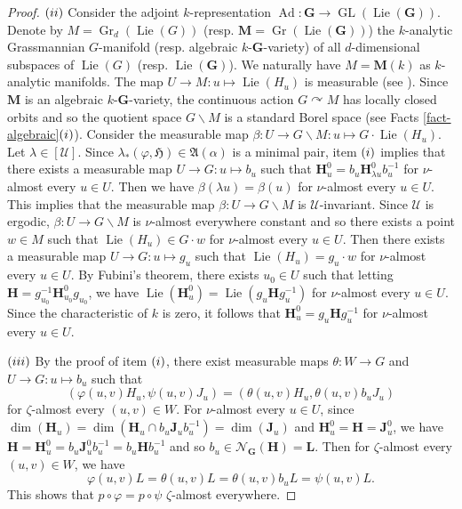 \documentclass[11pt]{amsart}
\numberwithin{equation}{section}
\theoremstyle{plain}
\theoremstyle{definition}
\newcommand{\Ad}{\operatorname{Ad}}
\newcommand{\GL}{\operatorname{GL}}
\newcommand{\Lie}{\operatorname{Lie}}
\newcommand{\Gr}{\operatorname{Gr}}
\begin{document}
\begin{proof}
$(\rm ii)$ Consider the adjoint $k$-representation $\Ad : \mathbf G \to \GL(\Lie(\mathbf G))$. Denote by $M = \Gr_d(\Lie(G))$ (resp.\! $\mathbf M = \Gr(\Lie(\mathbf G))$) the $k$-analytic Grassmannian $G$-manifold (resp.\! algebraic $k$-$\mathbf G$-variety) of all $d$-dimensional subspaces of $\Lie(G)$ (resp.\! $\Lie(\mathbf G)$). We naturally have $M = \mathbf M(k)$ as $k$-analytic manifolds. The map $U \to M : u \mapsto \Lie(H_u)$ is measurable (see \cite[Section 3]{NZ00}). Since $\mathbf M$ is an algebraic $k$-$\mathbf G$-variety, the continuous action $G \curvearrowright M$ has locally closed orbits and so the quotient space $G\backslash M$ is a standard Borel space (see Facts \ref{fact-algebraic}$(\rm i)$). Consider the measurable map $\beta : U \to G\backslash M : u \mapsto G \cdot \Lie(H_u)$. Let $\lambda \in [\mathscr U]$. Since $\lambda_\ast (\varphi, \mathfrak H) \in \mathfrak A(\alpha)$ is a minimal pair, item $(\rm i)$ implies that there exists a measurable map $U \to G : u \mapsto b_u$ such that $\mathbf H_u^0 = b_u \mathbf H_{\lambda u}^0 b_u^{-1}$ for $\nu$-almost every $u \in U$. Then we have $\beta(\lambda u) = \beta(u)$ for $\nu$-almost every $u \in U$. This implies that the measurable map $\beta : U \to G\backslash M$ is $\mathscr U$-invariant. Since $\mathscr U$ is ergodic, $\beta : U \to G\backslash M$ is $\nu$-almost everywhere constant and so there exists a point $w \in M$ such that $\Lie(H_u) \in G \cdot w$ for $\nu$-almost every $u \in U$. Then there exists a measurable map $U \to G : u \mapsto g_u$ such that $\Lie(H_u) = g_u \cdot w$ for $\nu$-almost every $u \in U$. By Fubini's theorem, there exists $u_0 \in U$ such that letting $\mathbf H = g_{u_0}^{-1} \mathbf H_{u_0}^0 g_{u_0}$, we have $\Lie(\mathbf H_u^0) = \Lie(g_u \mathbf H g_u^{-1})$ for $\nu$-almost every $u \in U$. Since the characteristic of $k$ is zero, it follows that $\mathbf H_u^0 = g_u \mathbf H g_u^{-1}$ for $\nu$-almost every $u \in U$.



$(\rm iii)$ By the proof of item $(\rm i)$, there exist measurable maps $\theta : W \to G$ and $U \to G : u \mapsto b_u$ such that 
$$(\varphi(u, v)H_u, \psi(u,v) J_u) = (\theta(u, v) H_u, \theta(u, v) b_u J_u)$$
for $\zeta$-almost every $(u, v) \in W$. For $\nu$-almost every $u \in U$, since $\dim(\mathbf H_u) = \dim(\mathbf H_u \cap b_u \mathbf J_u b_u^{-1}) = \dim(\mathbf J_u)$ and $\mathbf H_u^0 = \mathbf H = \mathbf J_u^0$, we have $\mathbf H =  \mathbf H_u^0 = b_u \mathbf J_u^0 b_u^{-1} = b_u \mathbf H b_u^{-1}$ and so $b_u \in \mathscr N_{\mathbf G}(\mathbf H) = \mathbf L$. Then for $\zeta$-almost every $(u, v) \in W$, we have
$$\varphi(u, v) L = \theta(u, v) L = \theta(u, v) b_u L = \psi(u, v) L.$$
This shows that $p \circ \varphi = p \circ \psi$ $\zeta$-almost everywhere.
\end{proof}
\end{document}
